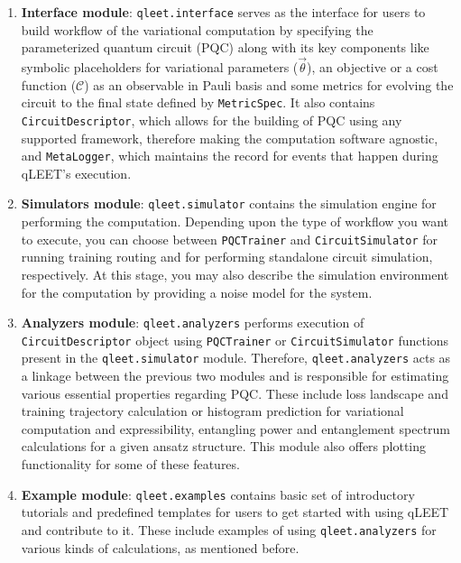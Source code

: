 \documentclass[%
 reprint,
 amsmath,
 amssymb,
 showkeys,
 pra,
 floatfix,
]{revtex4-2}
\begin{document}
\begin{enumerate}

	\item \textbf{Interface module}: \texttt{qleet.interface} serves as the interface for users to build workflow of the variational computation by specifying the parameterized quantum circuit (PQC) along with its key components like symbolic placeholders for variational parameters ($\vec{\theta}$), an objective or a cost function ($\mathcal{C}$) as an observable in Pauli basis and some metrics for evolving the circuit to the final state defined by \texttt{MetricSpec}. It also contains \texttt{CircuitDescriptor}, which allows for the building of PQC using any supported framework, therefore making the computation software agnostic, and \texttt{MetaLogger}, which maintains the record for events that happen during qLEET's execution. 

	\item \textbf{Simulators module}: \texttt{qleet.simulator} contains the  simulation engine for performing the computation. Depending upon the type of workflow you want to execute, you can choose between \texttt{PQCTrainer} and \texttt{CircuitSimulator} for running training routing and for performing standalone circuit simulation, respectively. At this stage, you may also describe the simulation environment for the computation by providing a noise model for the system. 

	\item \textbf{Analyzers module}: \texttt{qleet.analyzers} performs execution of \texttt{CircuitDescriptor} object using \texttt{PQCTrainer} or \texttt{CircuitSimulator} functions present in the \texttt{qleet.simulator} module. Therefore, \texttt{qleet.analyzers} acts as a linkage between the previous two modules and is responsible for estimating various essential properties regarding PQC. These include loss landscape and training trajectory calculation or histogram prediction for variational computation and expressibility, entangling power and entanglement spectrum calculations for a given ansatz structure. This module also offers plotting functionality for some of these features.
	
	\item \textbf{Example module}: \texttt{qleet.examples} contains basic set of introductory tutorials and predefined templates for users to get started with using qLEET and contribute to it. These include examples of using \texttt{qleet.analyzers} for various kinds of calculations, as mentioned before.

\end{enumerate} 
\end{document}
